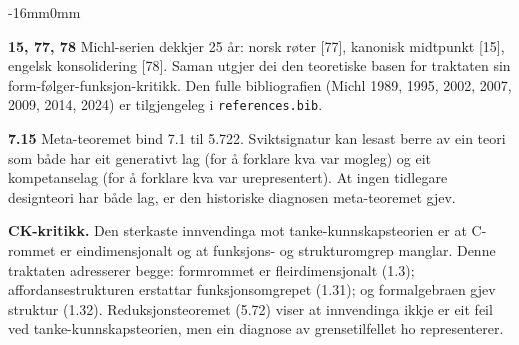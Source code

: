 \documentclass[10pt,oneside]{book}
\newenvironment{widebody}{%
  \begin{adjustwidth}{-16mm}{0mm}%
}{%
  \end{adjustwidth}%
}
\begin{document}
\begin{widebody}
{\textbf{15, 77, 78} Michl-serien dekkjer 25 år: norsk røter [77], kanonisk midtpunkt [15], engelsk konsolidering [78]. Saman utgjer dei den teoretiske basen for traktaten sin form-følger-funksjon-kritikk. Den fulle bibliografien (Michl 1989, 1995, 2002, 2007, 2009, 2014, 2024) er tilgjengeleg i \texttt{references.bib}.

\textbf{7.15} Meta-teoremet bind 7.1 til 5.722. Sviktsignatur kan lesast berre av ein teori som både har eit generativt lag (for å forklare kva var mogleg) og eit kompetanselag (for å forklare kva var urepresentert). At ingen tidlegare designteori har både lag, er den historiske diagnosen meta-teoremet gjev.

\textbf{CK-kritikk.} Den sterkaste innvendinga mot tanke-kunnskapsteorien er at C-rommet er eindimensjonalt og at funksjons- og strukturomgrep manglar. Denne traktaten adresserer begge: formrommet er fleirdimensjonalt (1.3); affordansestrukturen erstattar funksjonsomgrepet (1.31); og formalgebraen gjev struktur (1.32). Reduksjonsteoremet (5.72) viser at innvendinga ikkje er eit feil ved tanke-kunnskapsteorien, men ein diagnose av grensetilfellet ho representerer.

}
\end{widebody}
\end{document}
